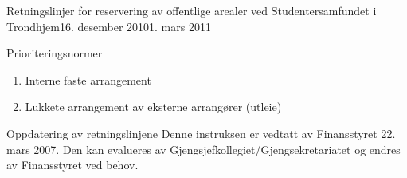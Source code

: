 \begin{instruks}{Retningslinjer for reservering av offentlige arealer
    ved Studentersamfundet i Trondhjem}{16. desember 2010}{1. mars 2011}
\begin{instruksledd}{Prioriteringsnormer}
\begin{enumerate}
\begin{enumerate}
\begin{enumerate}
                            \item Interne faste arrangement
                            \item Lukkete arrangement av eksterne arrangører (utleie)
                        \end{enumerate}
                \end{enumerate}
        \end{enumerate}
    \end{instruksledd}

    \begin{instruksledd}{Oppdatering av retningslinjene}
        Denne instruksen er vedtatt av Finansstyret 22. mars 2007. Den kan evalueres
        av Gjengsjefkollegiet/Gjengsekretariatet og endres av Finansstyret ved behov.
    \end{instruksledd}

\end{instruks}


